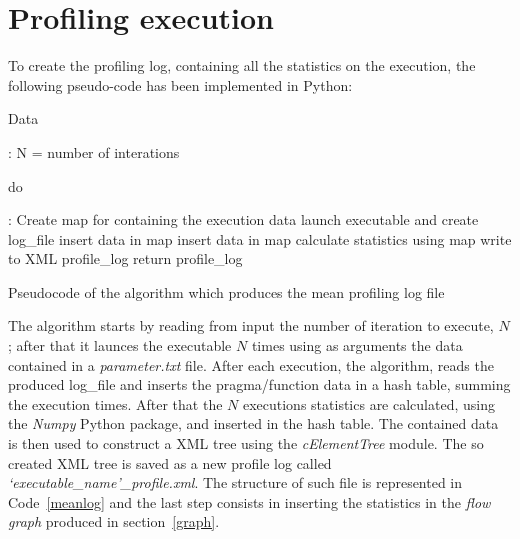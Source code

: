 \documentclass[a4paper,12pt,oneside]{book}
\begin{document}
\section{Profiling execution}

To create the profiling log, containing all the statistics on the execution, the following pseudo-code has been implemented in Python:

\begin{algorithm}[H]
\begin{algorithmic}
 \State \begin{bf}Data\end{bf}:{ N = number of interations}
\State \begin{bf}do\end{bf}: Create map for containing the execution data
\State launch executable and create log\_file
\State insert data in map
\EndFor
{}
\State insert data in map
\EndFor
\EndFor
\State calculate statistics using map\;
\State write to XML profile\_log
\EndFor
\State return profile\_log
\end{algorithmic}
\caption{Pseudocode of the algorithm which produces the mean profiling log file}
\end{algorithm}

The algorithm starts by reading from input the number of iteration to execute, $N$; after that it launces the executable $N$ times using as arguments the data contained in a \emph{parameter.txt} file. After each execution, the algorithm, reads the produced log\_file and inserts the pragma/function data in a hash table, summing the execution times. After that the $N$ executions statistics are calculated, using the \emph{Numpy} Python package, and inserted in the hash table. The contained data is then used to construct a XML tree using the \emph{cElementTree} module. The so created XML tree is saved as a new profile log called \emph{`executable\_name'\_profile.xml}. The structure of such file is represented in Code~\ref{meanlog} and the last step consists in inserting the statistics in the \emph{flow graph} produced in section~\ref{graph}.
\end{document}
